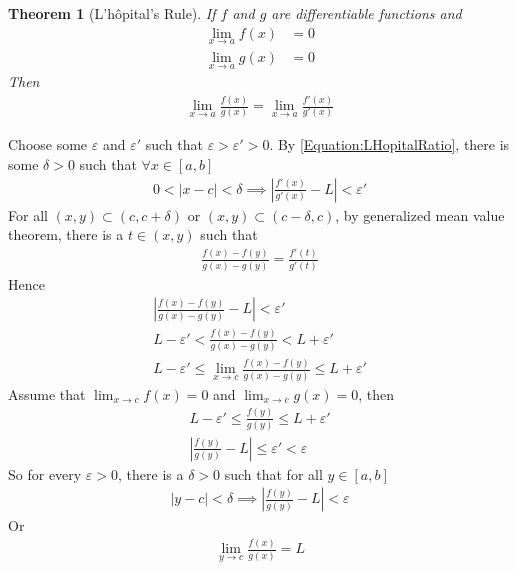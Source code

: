 \documentclass{amsart}
\numberwithin{equation}{section}
\let\oldendproof\endproof
\renewenvironment{proof}[1][\proofname]{%
  \setcounter{case}{0}
  \setcounter{step}{0}
  \oldproof[#1]%
}{\oldendproof}
\theoremstyle{plain}
\newtheorem{theorem}{Theorem}[section]
\theoremstyle{definition}
\theoremstyle{remark}
\begin{document}
\begin{theorem}[L'h\^{o}pital's Rule]
  If $f$ and $g$ are differentiable functions and
  \begin{align}
    \lim_{x\to a} f(x) &= 0\nonumber\\
    \lim_{x\to a} g(x) &= 0
  \end{align}
  Then
  \begin{align}
    \lim_{x\to a} \frac{f(x)}{g(x)}= \lim_{x\to a} \frac{f'(x)}{g'(x)} \label{Equation:LHopitalRatio}
  \end{align}
\end{theorem}
\begin{proof}
  Choose some $\varepsilon$ and $\varepsilon'$ such that $\varepsilon>\varepsilon'>0$. By \ref{Equation:LHopitalRatio}, there is some $\delta>0$ such that $\forall x\in[a,b]$
  \begin{align}
    0<|x-c|< \delta \implies \left|\frac{f'(x)}{g'(x)} - L\right|<\varepsilon'
  \end{align}
  For all $(x,y) \subset (c,c+\delta)$ or $(x,y)\subset (c-\delta, c)$, by generalized mean value theorem, there is a $t\in(x,y)$ such that
  \begin{align}
    \frac{f(x)-f(y)}{g(x)-g(y)} = \frac{f'(t)}{g'(t)}
  \end{align}
  Hence 
  \begin{align}
    \left|\frac{f(x)-f(y)}{g(x)-g(y)} - L\right|< \varepsilon'\nonumber\\
    L - \varepsilon'< \frac{f(x)-f(y)}{g(x)-g(y)} < L +  \varepsilon'\nonumber\\
    L-\varepsilon'\leq \lim_{x\to c} \frac{f(x) - f(y)}{g(x)-g(y)}\leq L + \varepsilon'
  \end{align}
  Assume that $\lim_{x\to c} f(x) = 0$ and $\lim_{x\to c} g(x) = 0$, then
  \begin{align}
    L - \varepsilon' \leq \frac{f(y)}{g(y)} \leq L + \varepsilon'\\
    \left|\frac{f(y)}{g(y)} - L\right|\leq \varepsilon'< \varepsilon
  \end{align}
  So for every $\varepsilon>0$, there is a $\delta>0$ such that for all $y\in[a,b]$
  \begin{align}
    |y-c| < \delta \implies \left|\frac{f(y)}{g(y)} - L\right|< \varepsilon
  \end{align}
  Or
  \begin{align}
    \lim_{y\to c} \frac{f(x)}{g(x)} = L
  \end{align}
\end{proof}
\end{document}
